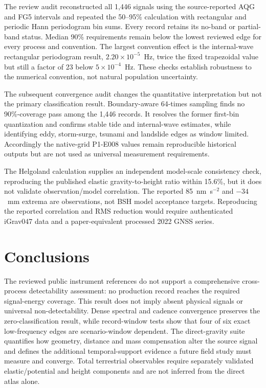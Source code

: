 \documentclass[11pt]{article}
\begin{document}
The review audit reconstructed all 1,446 signals using the source-reported AQG
and FG5 intervals and repeated the 50--95\% calculation with
rectangular and periodic Hann periodogram bin sums. Every record retains its
no-band or partial-band status. Median 90\% requirements remain below the lowest
reviewed edge for every process and convention. The largest convention effect
is the internal-wave rectangular periodogram result,
$2.20\times10^{-5}$~Hz, twice the fixed trapezoidal value but still a
factor of 23 below $5\times10^{-4}$~Hz. These checks establish robustness to the
numerical convention, not natural population uncertainty.

The subsequent convergence audit changes the quantitative interpretation but
not the primary classification result. Boundary-aware 64-times sampling finds
no 90\%-coverage pass among the 1,446 records. It resolves the former first-bin
quantization and confirms stable tide and internal-wave estimates, while
identifying eddy, storm-surge, tsunami and landslide edges as window limited.
Accordingly the native-grid P1-E008 values remain reproducible historical
outputs but are not used as universal measurement requirements.

The Helgoland calculation supplies an independent model-scale consistency
check, reproducing the published elastic gravity-to-height ratio within 15.6\%,
but it does not validate observation/model correlation. The reported
85~nm~s$^{-2}$ and $-34$~mm extrema are observations, not BSH model acceptance
targets. Reproducing the reported correlation and RMS reduction would require
authenticated iGrav047 data and a paper-equivalent processed 2022 GNSS series.

\section{Conclusions}
The reviewed public instrument references do not support a comprehensive
cross-process detectability assessment: no production record reaches the required
signal-energy coverage. This result does not imply absent physical signals or
universal non-detectability. Dense spectral and cadence convergence preserves
the zero-classification result, while record-window tests show that four of six
exact low-frequency edges are scenario-window dependent. The direct-gravity
suite quantifies how geometry, distance and mass compensation alter the source
signal and defines the additional temporal-support evidence a future field
study must measure and converge. Total terrestrial observables require
separately validated elastic/potential and height components and are not
inferred from the direct atlas alone.
\end{document}

